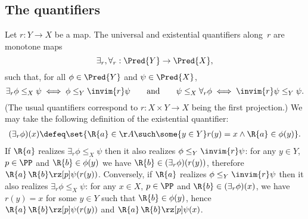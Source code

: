 \subsection{The quantifiers}
\label{sec:quantifiers}

Let $r : Y \to X$ be a map. The universal and existential quantifiers along~$r$ are monotone maps
%
\begin{equation*}
  \exists_r, \forall_r : \Pred{Y} \to \Pred{X},
\end{equation*}
%
such that, for all $\phi \in \Pred{Y}$ and $\psi \in \Pred{X}$,
%
\begin{equation*}
  \exists_r \phi \leq_X \psi \iff \phi \leq_Y \invim{r} \psi
  \qquad\text{and}\qquad
  \psi \leq_X \forall_r \phi \iff \invim{r} \psi \leq_Y \psi.
\end{equation*}
%
(The usual quantifiers correspond to $r : X \times Y \to X$ being the first projection.)
%
We may take the following definition of the existential quantifier:
%
\begin{align*}
  (\exists_r \phi)(x) \defeq
   \set{\R{a} \in \AA \such \some{y \in Y} r(y) = x \land \R{a} \in \phi(y)}.
\end{align*}
%
If $\R{a}$ realizes $\exists_r \phi \leq_X \psi$ then it also realizes $\phi \leq_Y \invim{r} \psi$:
%
for any $y \in Y$, $p \in \PP$ and $\R{b} \in \phi(y)$ we have $\R{b} \in (\exists_r \phi)(r(y))$, therefore $\R{a} \, \R{b} \rz[p] \psi(r(y))$.
%
Conversely, if $\R{a}$ realizes $\phi \leq_Y \invim{r} \psi$ then it also realizes $\exists_r \phi \leq_X \psi$: for any $x \in X$, $p \in \PP$ and $\R{b} \in (\exists_r \phi)(x)$, we have $r(y) = x$ for some $y \in Y$ such that $\R{b} \in \phi(y)$, hence $\R{a} \, \R{b} \rz[p] \psi(r(y))$ and $\R{a} \, \R{b} \rz[p] \psi(x)$.

